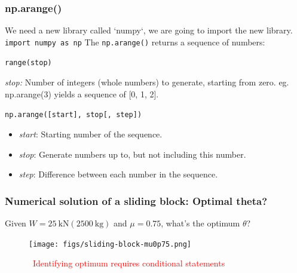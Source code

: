 \documentclass[notes]{beamer}
\begin{document}
\begin{frame}[fragile]
	\frametitle{np.arange()}
	We need a new library called `numpy`, we are going to import the new library.
	\verb|import numpy as np|
	The \verb|np.arange()| returns a sequence of numbers:
	
		\vspace{0.5cm}
		
		\verb|range(stop)|
		
		\vspace{0.5cm}
	
	\textit{stop:} Number of integers (whole numbers) to generate, starting from zero. eg. np.arange(3) yields a sequence of [0, 1, 2].
	
	\vspace{0.5cm}
	
	\verb|np.arange([start], stop[, step])|
	
	\begin{itemize}
		\item \textit{start}: Starting number of the sequence.
		\item \textit{stop}: Generate numbers up to, but not including this number.
		\item \textit{step}: Difference between each number in the sequence.
	\end{itemize}
	
\end{frame}



\begin{frame}
	\frametitle{Numerical solution of a sliding block: Optimal theta?}
	Given $W = \SI{25}{\kilo\newton} (\SI{2500}{\kilogram})$ and $\mu = 0.75$, what's the optimum $\theta$?
	\begin{figure}[ht]
		\centering
		\texttt{[image: figs/sliding-block-mu0p75.png]}
		\caption*{\textcolor{red}{\faQuestionCircleO ~Identifying optimum requires conditional statements}}
	\end{figure}

\end{frame}
\end{document}
